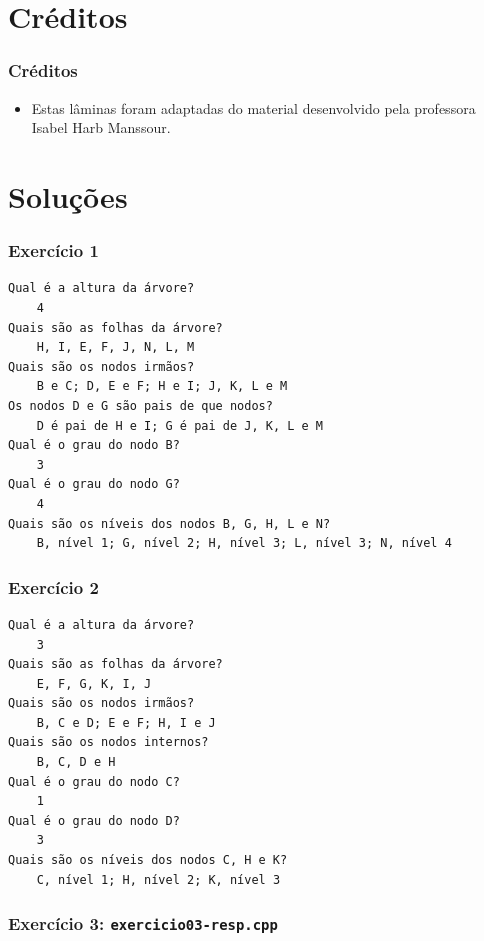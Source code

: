 \documentclass[aspectratio=169]{beamer}
\begin{document}
\section{Créditos}

\begin{frame}\frametitle{Créditos}
\begin{itemize}
	\item Estas lâminas foram adaptadas do material desenvolvido pela professora Isabel Harb Manssour.
\end{itemize}
\end{frame}

\section{Soluções}

\begin{frame}[fragile]\frametitle{Exercício 1}
\small{
\begin{verbatim}
Qual é a altura da árvore?
    4
Quais são as folhas da árvore?
    H, I, E, F, J, N, L, M
Quais são os nodos irmãos?
    B e C; D, E e F; H e I; J, K, L e M
Os nodos D e G são pais de que nodos?
    D é pai de H e I; G é pai de J, K, L e M
Qual é o grau do nodo B?
    3
Qual é o grau do nodo G?
    4
Quais são os níveis dos nodos B, G, H, L e N? 
    B, nível 1; G, nível 2; H, nível 3; L, nível 3; N, nível 4
\end{verbatim}
}
\end{frame}

\begin{frame}[fragile]\frametitle{Exercício 2}
\small{
\begin{verbatim}
Qual é a altura da árvore?
    3
Quais são as folhas da árvore?
    E, F, G, K, I, J
Quais são os nodos irmãos?
    B, C e D; E e F; H, I e J
Quais são os nodos internos?
    B, C, D e H
Qual é o grau do nodo C?
    1
Qual é o grau do nodo D?
    3
Quais são os níveis dos nodos C, H e K?
    C, nível 1; H, nível 2; K, nível 3
\end{verbatim}
}
\end{frame}

\begin{frame}[fragile]\frametitle{Exercício 3: \texttt{exercicio03-resp.cpp}}
\fontsize{3pt}{5pt}\selectfont{

}
\end{frame}
\end{document}
